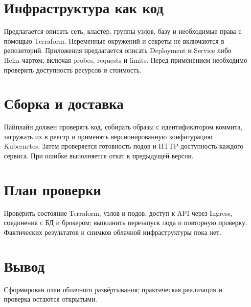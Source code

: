 \documentclass[14pt,a4paper]{extarticle}
\begin{document}
\section{Инфраструктура как код}
Предлагается описать сеть, кластер, группы узлов, базу и необходимые права с помощью Terraform. Переменные окружений и секреты не включаются в репозиторий. Приложения предлагается описать Deployment и Service либо Helm-чартом, включая probes, requests и limits. Перед применением необходимо проверить доступность ресурсов и стоимость.
\section{Сборка и доставка}
Пайплайн должен проверять код, собирать образы с идентификатором коммита, загружать их в реестр и применять версионированную конфигурацию Kubernetes. Затем проверяется готовность подов и HTTP-доступность каждого сервиса. При ошибке выполняется откат к предыдущей версии.
\section{План проверки}
Проверить состояние Terraform, узлов и подов, доступ к API через Ingress, соединения с БД и брокером; выполнить перезапуск пода и повторную проверку. Фактических результатов и снимков облачной инфраструктуры пока нет.
\section{Вывод}
Сформирован план облачного развёртывания; практическая реализация и проверка остаются открытыми.
\end{document}
